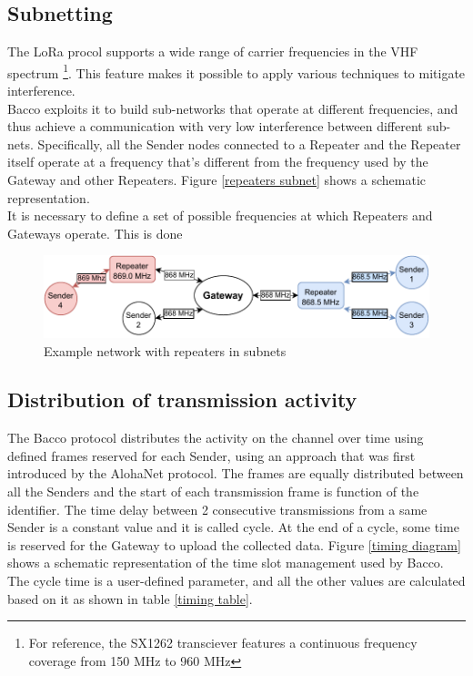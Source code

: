 \subsection{Subnetting}
The LoRa procol supports a wide range of carrier frequencies in the \gls{VHF} spectrum \footnote{For reference, the
SX1262\cite{sx1262} transciever features a continuous frequency coverage from 150 MHz to 960 MHz}. This feature makes
it possible to apply various techniques to mitigate interference.\\
Bacco exploits it to build sub-networks that operate at different frequencies, and thus achieve a communication with very low
interference between different sub-nets. Specifically, all the Sender nodes connected to a Repeater and the Repeater
itself operate at a frequency that's different from the frequency used by the Gateway and other Repeaters. Figure \ref{repeaters
subnet} shows a schematic representation.\\
It is necessary to define a set of possible frequencies at which Repeaters and Gateways operate. This is done 

\begin{figure}[ht]
    \centering
    \includegraphics[width=\linewidth]{uml/repeaters_subnet.pdf}
    \caption{Example network with repeaters in subnets}
    \label{repeaters subnet}
\end{figure}


\subsection{Distribution of transmission activity}
The Bacco protocol distributes the activity on the channel over time using defined frames reserved for each Sender, using
an approach that was first introduced by the AlohaNet\cite{alohanet} protocol. The frames are equally distributed between
all the Senders and the start of each transmission frame is function of the identifier. The time delay between 2 consecutive
transmissions from a same Sender is a constant value and it is called cycle. At the end of a cycle, some time is
reserved for the Gateway to upload the collected data. Figure \ref{timing diagram} shows a schematic representation of
the time slot management used by Bacco. The cycle time is a user-defined parameter, and all the other values are
calculated based on it as shown in table \ref{timing table}. \\

